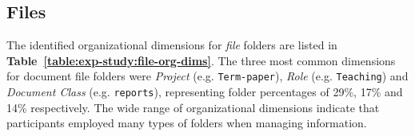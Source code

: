 \subsection{Files}

The identified organizational dimensions for \textit{file} folders are listed in \textbf{Table~\ref{table:exp-study:file-org-dims}}. 
The three most common dimensions for document file folders were \textit{Project} (e.g. \texttt{Term-paper}), \textit{Role} (e.g. \texttt{Teaching}) and \textit{Document Class} (e.g. \texttt{reports}), representing folder percentages of 29\%, 17\% and 14\% respectively.  The wide range of organizational dimensions indicate that participants employed many types of folders when managing information.


